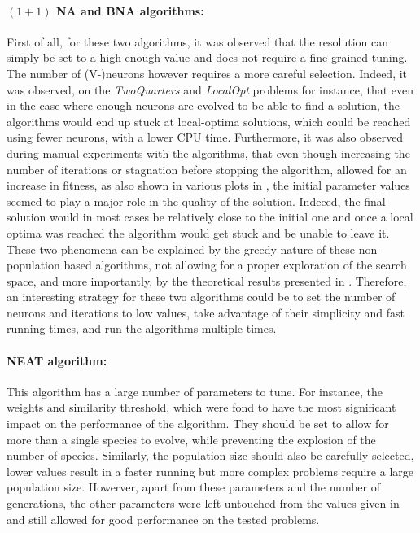 \paragraph{$(1 + 1)$ NA and BNA algorithms:} First of all, for these two algorithms, it was observed that the resolution can simply be set to a high enough value and does not require a
fine-grained tuning. The number of (V-)neurons however requires a more careful selection. Indeed, it was observed, on the \textit{TwoQuarters} and \textit{LocalOpt} problems for instance, that
even in the case where enough neurons are evolved to be able to find a solution, the algorithms would end up stuck at local-optima solutions, which could be reached using fewer neurons, with a
lower CPU time. Furthermore, it was also observed during manual experiments with the algorithms, that even though increasing the number of iterations or stagnation before stopping the algorithm,
allowed for an increase in fitness, as also shown in various plots in , the initial parameter values seemed to play a major role in the quality of the solution. Indeeed, the final
solution would in most cases be relatively close to the initial one and once a local optima was reached the algorithm would get stuck and be unable to leave it. These two phenomena can be explained by the greedy nature of
these non-population based algorithms, not allowing for a proper exploration of the search space, and more importantly, by the theoretical results presented in \cite{na,bna}. Therefore, an interesting strategy for
these two algorithms could be to set the number of neurons and iterations to low values, take advantage of their simplicity and fast running times, and run the algorithms multiple times.

\paragraph{NEAT algorithm:} This algorithm has a large number of parameters to tune. For instance, the weights and similarity threshold, which were fond
to have the most significant impact on the performance of the algorithm.
They should be set to allow for more than a single species to evolve, while preventing the explosion of the number of species. Similarly, the population size should also be
carefully selected, lower values result in a faster running but more complex problems require a large population size. Howerver, apart from these parameters and the number of generations,
the other parameters were left untouched from the values given in \cite{neat} and still allowed for good performance on the tested problems.

